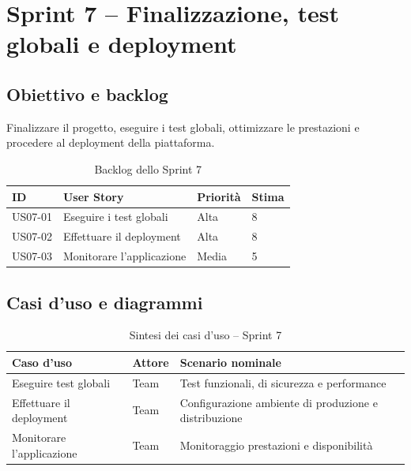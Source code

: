 \section{Sprint 7 -- Finalizzazione, test globali e deployment}
\label{sec:sprint7}

\subsection{Obiettivo e backlog}
\label{subsec:sprint7-obiettivo}

Finalizzare il progetto, eseguire i test globali, ottimizzare le prestazioni e procedere al deployment della piattaforma.

\begin{table}[H]
    \centering
    \caption{Backlog dello Sprint 7}
    \label{tab:sprint7-backlog}
    \renewcommand{\arraystretch}{1.3}
    \begin{tabular}{|p{1.8cm}|p{7cm}|p{2.5cm}|p{1.5cm}|}
        \hline
        \textbf{ID} & \textbf{User Story} & \textbf{Priorità} & \textbf{Stima} \\
        \hline
        US07-01 & Eseguire i test globali & Alta & 8 \\
        \hline
        US07-02 & Effettuare il deployment & Alta & 8 \\
        \hline
        US07-03 & Monitorare l'applicazione & Media & 5 \\
        \hline
    \end{tabular}
\end{table}

\subsection{Casi d'uso e diagrammi}
\label{subsec:sprint7-casi-uso}

\begin{table}[H]
    \centering
    \caption{Sintesi dei casi d'uso -- Sprint 7}
    \label{tab:uc-sprint7}
    \renewcommand{\arraystretch}{1.3}
    \begin{tabular}{|p{3cm}|p{2.5cm}|p{8.5cm}|}
        \hline
        \textbf{Caso d'uso} & \textbf{Attore} & \textbf{Scenario nominale} \\
        \hline
        Eseguire test globali & Team & Test funzionali, di sicurezza e performance \\
        \hline
        Effettuare il deployment & Team & Configurazione ambiente di produzione e distribuzione \\
        \hline
        Monitorare l'applicazione & Team & Monitoraggio prestazioni e disponibilità \\
        \hline
    \end{tabular}
\end{table}




